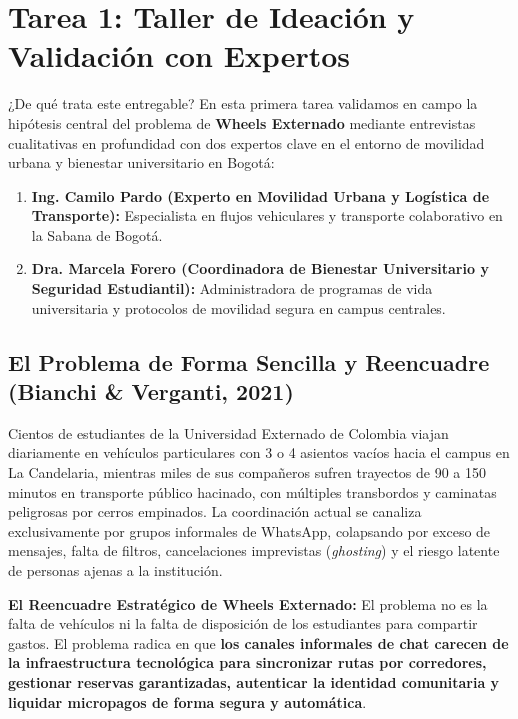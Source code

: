 \documentclass[11pt,a4paper]{article}
\begin{document}
\newpage
\tableofcontents
\newpage

\section{Tarea 1: Taller de Ideación y Validación con Expertos}

\begin{externadobox}{¿De qué trata este entregable?}
En esta primera tarea validamos en campo la hipótesis central del problema de \textbf{Wheels Externado} mediante entrevistas cualitativas en profundidad con dos expertos clave en el entorno de movilidad urbana y bienestar universitario en Bogotá:
\begin{enumerate}
    \item \textbf{Ing. Camilo Pardo (Experto en Movilidad Urbana y Logística de Transporte):} Especialista en flujos vehiculares y transporte colaborativo en la Sabana de Bogotá.
    \item \textbf{Dra. Marcela Forero (Coordinadora de Bienestar Universitario y Seguridad Estudiantil):} Administradora de programas de vida universitaria y protocolos de movilidad segura en campus centrales.
\end{enumerate}
\end{externadobox}

\subsection{El Problema de Forma Sencilla y Reencuadre (Bianchi \& Verganti, 2021)}
Cientos de estudiantes de la Universidad Externado de Colombia viajan diariamente en vehículos particulares con 3 o 4 asientos vacíos hacia el campus en La Candelaria, mientras miles de sus compañeros sufren trayectos de 90 a 150 minutos en transporte público hacinado, con múltiples transbordos y caminatas peligrosas por cerros empinados. La coordinación actual se canaliza exclusivamente por grupos informales de WhatsApp, colapsando por exceso de mensajes, falta de filtros, cancelaciones imprevistas (\textit{ghosting}) y el riesgo latente de personas ajenas a la institución.

\textbf{El Reencuadre Estratégico de Wheels Externado:}
El problema no es la falta de vehículos ni la falta de disposición de los estudiantes para compartir gastos. El problema radica en que \textbf{los canales informales de chat carecen de la infraestructura tecnológica para sincronizar rutas por corredores, gestionar reservas garantizadas, autenticar la identidad comunitaria y liquidar micropagos de forma segura y automática}.
\end{document}
